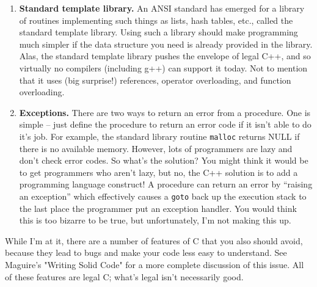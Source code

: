 \begin{enumerate}
\item {\bf Standard template library.} An ANSI standard has emerged for a
library of routines implementing such things as lists, hash tables,
etc., called the standard template library.  Using such a library
should make programming much simpler if the data structure you need
is already provided in the library.  Alas, the standard template
library pushes the envelope of legal C++, and so virtually no
compilers (including g++) can support it today.  Not to mention that 
it uses (big surprise!) references, operator overloading, and 
function overloading.

\item {\bf Exceptions.} There are two ways to return an error from
a procedure.  One is simple -- just define the procedure to return
an error code if it isn't able to do it's job.  For example,
the standard library routine {\tt malloc} returns NULL if there
is no available memory.  However, lots of programmers are lazy and 
don't check error codes.  So what's the solution?  You might think 
it would be to get programmers who aren't lazy, but no, the C++ solution 
is to add a programming language construct!  A procedure can
return an error by ``raising an exception'' which effectively
causes a {\tt goto} back up the execution stack to the last
place the programmer put an exception handler.  You would think
this is too bizarre to be true, but unfortunately,
I'm not making this up.

\end{enumerate}

While I'm at it, there are a number of features of C that you also
should avoid, because they lead to bugs and make your code less easy
to understand.  See Maguire's "Writing Solid Code" for a more complete
discussion of this issue.  All of these features are legal C;
what's legal isn't necessarily good.

